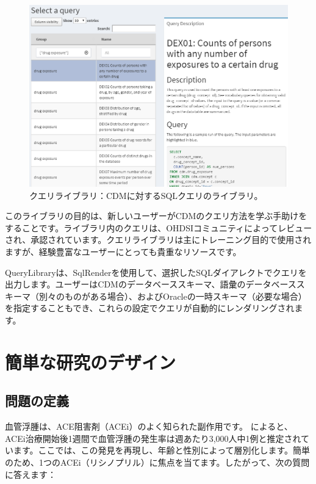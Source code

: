 \documentclass[
  11pt]{book}
\theoremstyle{definition}
\theoremstyle{definition}
\theoremstyle{definition}
\theoremstyle{definition}
\theoremstyle{remark}
\begin{document}
\begin{figure}

{\centering \includegraphics[width=1\linewidth]{images/SqlAndR/queryLibrary} 

}

\caption{クエリライブラリ：CDMに対するSQLクエリのライブラリ。}\label{fig:queryLibrary}
\end{figure}

このライブラリの目的は、新しいユーザーがCDMのクエリ方法を学ぶ手助けをすることです。ライブラリ内のクエリは、OHDSIコミュニティによってレビューされ、承認されています。クエリライブラリは主にトレーニング目的で使用されますが、経験豊富なユーザーにとっても貴重なリソースです。

QueryLibraryは、SqlRenderを使用して、選択したSQLダイアレクトでクエリを出力します。ユーザーはCDMのデータベーススキーマ、語彙のデータベーススキーマ（別々のものがある場合）、およびOracleの一時スキーマ（必要な場合）を指定することもでき、これらの設定でクエリが自動的にレンダリングされます。

\section{簡単な研究のデザイン}\label{ux7c21ux5358ux306aux7814ux7a76ux306eux30c7ux30b6ux30a4ux30f3}

\subsection{問題の定義}\label{ux554fux984cux306eux5b9aux7fa9}

血管浮腫は、ACE阻害剤（ACEi）のよく知られた副作用です。\citet{slater_1988} によると、ACEi治療開始後1週間で血管浮腫の発生率は週あたり3,000人中1例と推定されています。ここでは、この発見を再現し、年齢と性別によって層別化します。簡単のため、1つのACEi（リシノプリル）に焦点を当てます。したがって、次の質問に答えます：
\end{document}
